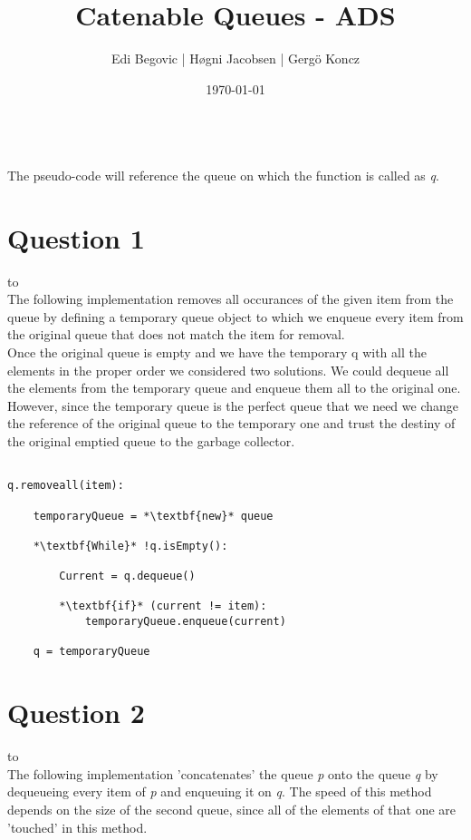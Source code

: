 \documentclass[a4paper]{article}
\title{Catenable Queues - ADS}
\author{Edi Begovic | Høgni Jacobsen | Gergö Koncz}
\date{\today}
\def\headline#1{\hbox to \hsize{\hrulefill\quad\lower.3em\hbox{#1}\quad\hrulefill}}
\begin{document}
 
\maketitle

\ \\
\noindent
The pseudo-code will reference the queue on which the function is called as \textit{q}.
\ \\
\section*{Question 1}
\headline{-} \ \\

\noindent
The following implementation removes all occurances of the given item from the queue by defining a temporary queue
object to which we enqueue every item from the original queue that does not match the item for removal. 
\ \\

\noindent
Once the original queue is empty and we have the temporary q with all the elements in the proper order we considered two solutions. We could dequeue all the elements from the temporary queue and enqueue them all to the original one. However, since the temporary queue is the perfect queue that we need we change the reference of the original queue to the temporary one and trust the destiny of the original emptied queue to the garbage collector. 

\noindent
\begin{lstlisting}[escapeinside={{*}{*}}]

q.removeall(item):

    temporaryQueue = *\textbf{new}* queue

    *\textbf{While}* !q.isEmpty():

        Current = q.dequeue()
        
        *\textbf{if}* (current != item):
            temporaryQueue.enqueue(current) 
    
    q = temporaryQueue

\end{lstlisting}

\newpage
\section*{Question 2}
\headline{-} \ \\
The following implementation 'concatenates' the queue \textit{p} onto the queue \textit{q} by
dequeueing every item of \textit{p} and enqueuing it on \textit{q}. The speed of this method depends on the size of the second queue, since all of the elements of that one are 'touched' in this method.
\ \\
\end{document}
